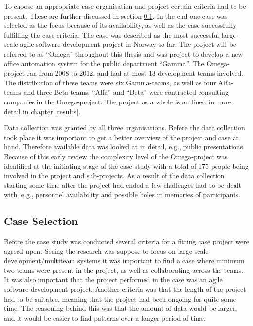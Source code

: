To choose an appropriate case organisation and project certain criteria had to be present. These are further discussed in section \ref{case_selection}. In the end one case was selected as the focus because of its availability, as well as the case successfully fulfilling the case criteria. The case was described as the most successful large-scale agile software development project in Norway so far. The project will be referred to as ``Omega'' throughout this thesis and was project to develop a new office automation system for the public department ``Gamma''. The Omega-project ran from 2008 to 2012, and had at most 13 development teams involved. The distribution of these teams were six Gamma-teams, as well as four Alfa-teams and three Beta-teams. ``Alfa'' and ``Beta'' were contracted consulting companies in the Omega-project. The project as a whole is outlined in more detail in chapter \ref{results}.

Data collection was granted by all three organisations. Before the data collection took place it was important to get a better overview of the project and case at hand. Therefore available data was looked at in detail, e.g., public presentations. Because of this early review the complexity level of the Omega-project was identified at the initiating stage of the case study with a total of 175 people being involved in the project and sub-projects. As a result of the data collection starting some time after the project had ended a few challenges had to be dealt with, e.g., personnel availability and possible holes in memories of participants.

\subsection{Case Selection}
\label{case_selection}

Before the case study was conducted several criteria for a fitting case project were agreed upon. Seeing the research was suppose to focus on large-scale development/multiteam systems it was important to find a case where minimum two teams were present in the project, as well as collaborating across the teams. It was also important that the project performed in the case was an agile software development project. Another criteria was that the length of the project had to be suitable, meaning that the project had been ongoing for quite some time. The reasoning behind this was that the amount of data would be larger, and it would be easier to find patterns over a longer period of time.

